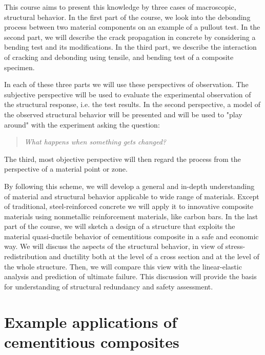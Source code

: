 \documentclass[main.tex]{subfiles}
\begin{document}
This course aims to present this knowledge by three 
cases of macroscopic, structural behavior.
In the first part of the course, we look into the debonding process 
between two material components on an example of a pullout test. 
In the second part,
we will describe the crack propagation in concrete by considering
a bending test and its modifications. In the third part,
we describe the interaction of cracking and debonding using 
tensile, and bending test of a composite specimen.

In each of these three parts we will use 
these perspectives of observation. 
The subjective perspective will be used
to evaluate the experimental observation
of the structural response, i.e. the test results.
In the second perspective, a model of the observed
structural behavior will be presented and will be used to "play around" with the experiment asking the question:
\begin{quote}
\textit{What happens when something gets changed?}
\end{quote}
The third, most objective perspective will then 
regard the process from the perspective of a material point or zone.

By following this scheme, we will develop a general and in-depth understanding 
of material and structural behavior applicable to wide range of
materials. Except of traditional, steel-reinforced concrete
we will apply it to innovative composite materials using 
nonmetallic reinforcement materials, like carbon bars.
In the last part of the course, we will sketch a design of a structure 
that exploits the material quasi-ductile behavior of cementitious composite 
in a safe and economic way. We will discuss the aspects of the structural behavior, 
in view of stress-redistribution and ductility both at the level of a cross 
section and at the level of the whole structure. Then, we will compare 
this view with the linear-elastic analysis and prediction of ultimate failure. 
This discussion will provide the basis for understanding of 
structural redundancy and safety assessment.



\section{Example applications of cementitious composites}

\end{document}
